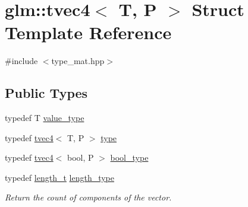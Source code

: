 \hypertarget{structglm_1_1tvec4}{}\section{glm\+::tvec4$<$ T, P $>$ Struct Template Reference}
\label{structglm_1_1tvec4}


{\ttfamily \#include $<$type\+\_\+mat.\+hpp$>$}

\subsection*{Public Types}
\begin{DoxyCompactItemize}
\item 
typedef T \mbox{\hyperlink{structglm_1_1tvec4_ac6521112942e4500f26c0c0799b2cfa9}{value\+\_\+type}}
\item 
typedef \mbox{\hyperlink{structglm_1_1tvec4}{tvec4}}$<$ T, P $>$ \mbox{\hyperlink{structglm_1_1tvec4_a8896f36a5499c8908772db7faf59e981}{type}}
\item 
typedef \mbox{\hyperlink{structglm_1_1tvec4}{tvec4}}$<$ bool, P $>$ \mbox{\hyperlink{structglm_1_1tvec4_aace03487e0707681ffa197d4e844501b}{bool\+\_\+type}}
\item 
typedef \mbox{\hyperlink{namespaceglm_a090a0de2260835bee80e71a702492ed9}{length\+\_\+t}} \mbox{\hyperlink{structglm_1_1tvec4_a4e2b34a427cac7e72b6f73173c206feb}{length\+\_\+type}}
\begin{DoxyCompactList}\small\item\em Return the count of components of the vector. \end{DoxyCompactList}\end{DoxyCompactItemize}
